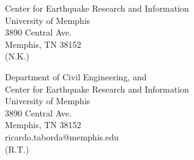 
\vspace{4ex}

\noindent
Center for Earthquake Research and Information\\
University of Memphis\\
3890 Central Ave.\\
Memphis, TN 38152\\
\indent(N.K.)

\vspace{2ex}

\noindent
Department of Civil Engineering, and\\
Center for Earthquake Research and Information\\
University of Memphis\\
3890 Central Ave.\\
Memphis, TN 38152\\
ricardo.taborda@memphis.edu\\
\indent(R.T.)

